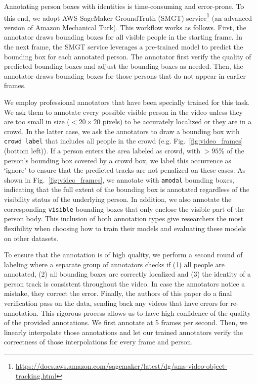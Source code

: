 \documentclass[runningheads]{llncs}
\begin{document}
Annotating person boxes with identities is time-consuming and error-prone. To this end, we adopt AWS SageMaker GroundTruth (SMGT) service\footnote{\scriptsize \url{https://docs.aws.amazon.com/sagemaker/latest/dg/sms-video-object-tracking.html}} (an advanced version of Amazon Mechanical Turk). This workflow works as follows. First, the annotator draws bounding boxes for all visible people in the starting frame. In the next frame, the SMGT service leverages a pre-trained model to predict the bounding box for each annotated person.
The annotator first verify the quality of predicted bounding boxes and adjust the bounding boxes as needed. Then, the annotator draws bounding boxes for those persons that do not appear in earlier frames. 

We employ professional annotators that have been specially trained for this task. 
We ask them to annotate every possible visible person in the video unless they are too small in size ($< 20 \times 20$ pixels) to be accurately localized or they are in a crowd. 
In the latter case, we ask the annotators to draw a bounding box with \texttt{crowd label} that includes all people in the crowd (e.g. Fig.~\ref{fig:video_frames}(bottom left)). If a person enters the area labeled as crowd, with  $>95\%$ of the person's bounding box covered by a crowd box, we label this occurrence as `ignore' to ensure that the predicted tracks are not penalized on these cases. 
As shown in Fig.~\ref{fig:video_frames}, we annotate with \texttt{amodal} bounding boxes, indicating that the full extent of the bounding box is annotated regardless of the visibility status of the underlying person. In addition, we also annotate the corresponding \texttt{visible} bounding boxes that only enclose the visible part of the person body. This inclusion of both annotation types give researchers the most flexibility when choosing how to train their models and evaluating these models on other datasets.







To ensure that the annotation is of high quality, we perform a second round of labeling where a separate group of annotators checks if (1) all people are annotated, (2) all bounding boxes are correctly localized and (3) the identity of a person track is consistent throughout the video. In case the annotators notice a mistake, they correct the error. 
Finally, the authors of this paper do a final verification pass on the data, sending back any videos that have errors for re-annotation. This rigorous process allows us to have high confidence of the quality of the provided annotations. 
We first annotate at 5 frames per second. Then, we linearly interpolate those annotations and let our trained annotators verify the correctness of those interpolations for every frame and person. 
\end{document}
